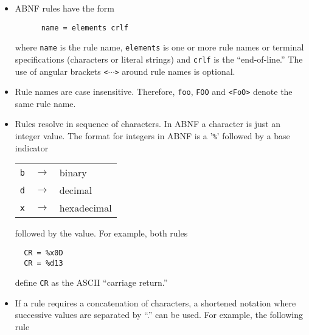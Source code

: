 \documentclass{medusabook}
\begin{document}
\begin{itemize}
  \item
    ABNF rules have the form
    \begin{verbatim}
      name = elements crlf
    \end{verbatim}
where \texttt{name} is the rule name, \texttt{elements} is one or more
   rule names or terminal specifications (characters or literal
   strings) and \texttt{crlf} is the ``end-of-line.'' The use of
   angular brackets \texttt{<$\cdots$>} around rule names is optional.
\item
Rule names are case insensitive.  Therefore, \texttt{foo},
\texttt{FOO} and \texttt{<FoO>}  denote the same rule name.
\item
Rules resolve in sequence of characters.  In ABNF a character is just
an integer value. The format for integers in ABNF is a '\texttt{\%}'
followed by a base indicator

\begin{center}
  \begin{tabular}{rcl}
    \texttt{b} & $\rightarrow$ & binary \\
    \texttt{d} & $\rightarrow$ & decimal \\
    \texttt{x} & $\rightarrow$ & hexadecimal 
  \end{tabular}
\end{center}
%
followed by the value.  For example, both rules

\begin{verbatim}
  CR = %x0D
  CR = %d13
\end{verbatim}
%
define \texttt{CR} as the ASCII ``carriage return.''
\item
If a rule requires a concatenation of characters, a shortened notation
where successive values are separated by ``.'' can be used.  For
example, the following rule


\end{itemize}
\end{document}
